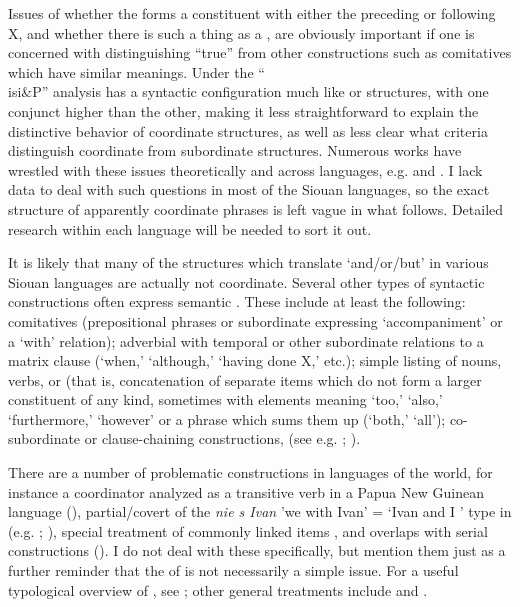 \documentclass[output=paper]{LSP/langsci}
\begin{document}
Issues of whether the  forms a constituent with either the preceding or following X, and whether there is such a thing as a , are obviously important if one is concerned with distinguishing ``true''  from other constructions such as comitatives which have similar meanings. Under the ``\\isi{\&P}'' analysis  has a syntactic configuration much like  or  structures, with one conjunct higher than the other, making it less straightforward to explain the distinctive behavior of coordinate structures, as well as less clear what criteria distinguish coordinate from subordinate structures. Numerous works have wrestled with these issues theoretically and across languages, e.g. \citet{Wesche1995} and  \citet{FabriciusHansenRamm2008}. I lack data to deal with such questions in most of the Siouan languages, so the exact structure of apparently coordinate phrases is left vague in what follows. Detailed research within each language will be needed to sort it out.

It is likely that many of the structures which translate `and/or/but' in various Siouan languages are actually not coordinate. Several other types of syntactic constructions often express semantic . These include at least the following:  comitatives (prepositional phrases or subordinate  expressing `accompaniment' or a `with' relation);  adverbial  with temporal or other subordinate relations to a matrix clause (`when,' `although,' `having done X,' etc.);  simple listing of nouns, verbs, or  (that is, concatenation of separate items which do not form a larger constituent of any kind, sometimes with elements meaning `too,' `also,' `furthermore,' `however' or a phrase which sums them up (`both,' `all');  co-subordinate or clause-chaining constructions, (see e.g. \citealt{Graczyk2007}; \citealt{Boyle2007}).

There are a number of problematic  constructions in languages of the world, for instance a coordinator analyzed as a transitive verb in a Papua New Guinean language (\citealt{BrownDryer2009}), partial/covert  of the \textit{nie s Ivan} 'we with Ivan' = `Ivan and I ' type in  (e.g. \citealt{McNally1993}; \citealt{Larson2014}), special treatment of commonly linked items \citep{Walchli2005}, and overlaps with serial constructions (\citealt{Carstens2002}). I do not deal with these specifically, but mention them just as a further reminder that the  of  is not necessarily a simple issue. For a useful typological overview of , see \citet{Haspelmath2007}; other general treatments include \citet{Johannessen1998} and  \citet{VanOirsouw1987}. 
\end{document}
